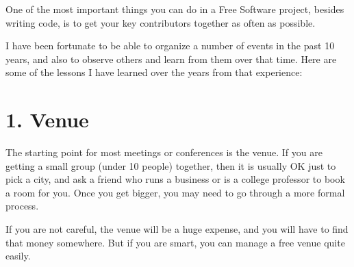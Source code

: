 

\noindent{}One of the most important things you can do in a Free Software project,
besides writing code, is to get your key contributors together as often
as possible.

I have been fortunate to be able to organize a number of events in the
past 10 years, and also to observe others and learn from them over that
time. Here are some of the lessons I have learned over the years from that
experience:

\section*{1. Venue}

The starting point for most meetings or conferences is the venue. If
you are getting a small group (under 10 people) together, then it is
usually OK just to pick a city, and ask a friend who runs a business or
is a college professor to book a room for you. Once you get bigger, you
may need to go through a more formal process.

If you are not careful, the venue will be a huge expense, and you will have
to find that money somewhere. But if you are smart, you can manage a
free venue quite easily.

